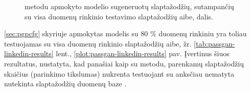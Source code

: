 \documentclass{VUMIFInfBakalaurinis}
\begin{document}
\begin{figure}[ht]
  \begin{center}
  \end{center}
  \caption{%
     metodu apmokyto modelio sugeneruotų slaptažodžių, 
    sutampančių su visa  duomenų rinkinio testavimo
    slaptažodžių aibe, dalis.
  }
  \label{plot:pcfg-linkedin-results}
\end{figure}
\ref{sec:pgpcfg} skyriuje apmokytas modelis su $80$ \%  
duomenų rinkiniu yra toliau testuojamas su visa  duomenų 
rinkinio slaptažodžių aibe, žr. \ref{tab:passgan-linkedin-results} lent., 
\ref{plot:passgan-linkedin-results} pav. Įvertinus šiuos rezultatus, nustatyta, 
kad panašiai kaip su  metodu, parenkamų slaptažodžių skaičius 
(parinkimo tikslumas) nukrenta testuojant su anksčiau nematyta nutekinta 
slaptažodžių duomenų baze .
\end{document}
